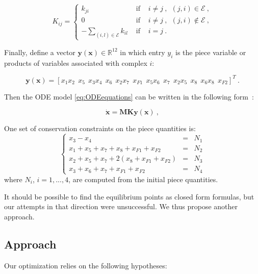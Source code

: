 		\begin{equation}
			K_{ij} =  \left\{
				\begin{array}{lll}
					k_{ji} &\mbox{ if }& i \neq j~, ~~(j,i) \in \mathcal{E}~, \\
					0 &\mbox{ if }& i \neq j~, ~~(j,i) \notin \mathcal{E}~,\\
					-\sum_{(i,l)\in {\mathcal E}} k_{il} &\mbox{ if }& i=j~.
				\end{array} \right. \label{eq:Kdef}
		\end{equation}
		
		Finally, define a vector $\mathbf{y(x)} \in \mathbb{R}^{12}$ in
		which entry $y_i$ is the piece variable or products of variables
		associated with complex $i$:
		
		\begin{equation} \mathbf{y(x)} = [x_1
			x_2~~x_5 ~~x_3 x_4 ~~x_6 ~~x_2 x_7 ~~x_{F1}~~x_5 x_6~~ x_7~~x_2 x_5
			~~x_8~~ x_6 x_8 ~~x_{F2}]^T~. \label{eq:ydef1}
		\end{equation}

		Then the ODE model \eqref{eq:ODEequations} can be written in the
		following form~\cite{Chaves:2004p11839}:
		
		\begin{equation}
			\mathbf{\dot{x}} = \mathbf{M}\mathbf{K}\mathbf{y}(\mathbf{x})~,
			\label{eq:matrixODE}
		\end{equation}

		One set of conservation constraints on the piece quantities is:
		\begin{equation}
			\left\lbrace
				\begin{array}{lll}
					x_3 - x_4 &=& N_1 \\
					x_1+x_5+x_7+x_8+x_{F1}+x_{F2} &=& N_2 \\
					x_2+x_5+x_7+2(x_8+x_{F1}+x_{F2}) &=& N_3 \\
					x_3+x_6+x_7+x_{F1}+x_{F2} &=& N_4
				\end{array}
			\right.
			\label{eq:cons}
		\end{equation}
		where $N_i$, $i=1,...,4$, are computed from the initial piece
		quantities.
		
		It should be possible to find the equilibrium points as closed form formulas, but our attempts in that direction were unsuccessful. We thus propose another approach.

	
	\subsection{Approach} %
	\label{sub:approach}
		Our optimization relies on the following hypotheses:
		
